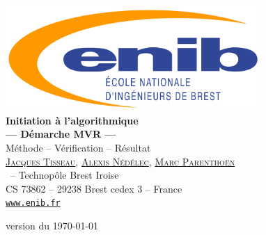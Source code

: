 \documentclass[11pt,a4paper,colorlinks,breaklinks]{book}
\renewcommand{\headrulewidth}{0pt}
\renewcommand{\footrulewidth}{0pt}
\begin{document}

\begin{titlepage}
\thispagestyle{fancy}
\setlength{\headheight}{0pt}
\setlength{\footskip}{0pt}
\renewcommand{\headrulewidth}{0pt}
\renewcommand{\footrulewidth}{0pt}
\fancyhead[L]{}
\fancyhead[C]{}
\fancyhead[R]{}
\fancyfoot[L]{}
\fancyfoot[C]{}
\fancyfoot[R]{}

\begin{center}
\includegraphics[height=4cm]{logo-enib}\\[2cm]
{\huge\textbf{Initiation à l'algorithmique}}\\[5mm]
{\Large\textbf{--- Démarche MVR ---}}\\[3mm]
{\large Méthode -- Vérification -- Résultat}\\[1cm]
{\Large\href{http://www.enib.fr/~tisseau}{\textsc{Jacques Tisseau}}, 
\href{http://www.enib.fr/~nedelec}{\textsc{Alexis Nédélec}},
\href{http://www.enib.fr/~parenthoen}{\textsc{Marc Parenthoën}}}\\[1mm]
\enib\  -- Technopôle Brest Iroise\\
CS 73862 -- 29238 Brest cedex 3 -- France\\
\href{http://www.enib.fr/}{\tt www.enib.fr}
\end{center}
\null\vfill

\centerline{\tiny version du \today}
\end{titlepage}

\pagestyle{fancy}
\fancyhead{}
\fancyhead[CE]{\rightmark}
\fancyhead[CO]{\leftmark}
\fancyhead[R]{\thepage/\pageref{LastPage}}
\fancyfoot{}
\fancyfoot[L]{}
\fancyfoot[C]{}
\fancyfoot[R]{}
\setlength{\headheight}{51pt}
\setlength{\footskip}{38pt}
\renewcommand{\headrulewidth}{0pt}
\renewcommand{\footrulewidth}{0pt}
\end{document}
